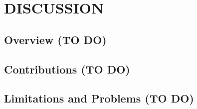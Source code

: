 \chapter{DISCUSSION}

\section{Overview (TO DO)}

\section{Contributions (TO DO)}

\section{Limitations and Problems (TO DO)}